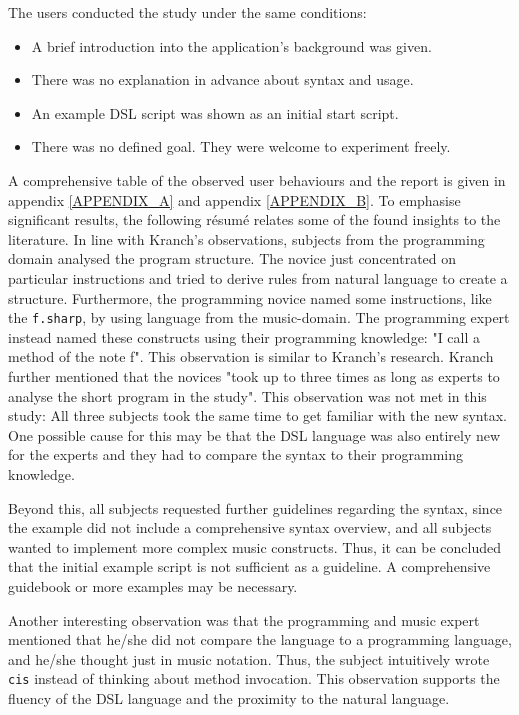 The users conducted the study under the same conditions:

\begin{itemize}
\item A brief introduction into the application's background was given.
\item There was no explanation in advance about syntax and usage.
\item An example DSL script was shown as an initial start script.
\item There was no defined goal. They were welcome to experiment freely.
\end{itemize}

A comprehensive table of the observed user behaviours and the report is given in appendix \ref{APPENDIX_A} and appendix \ref{APPENDIX_B}. To emphasise significant results, the following résumé relates some of the found insights to the literature.
\newline
\newline
In line with Kranch's observations, subjects from the programming domain analysed the program structure. The novice just concentrated on particular instructions and tried to derive rules from natural language to create a structure.\cite{Kranch2012} Furthermore, the programming novice named some instructions, like the \texttt{f.sharp}, by using language from the music-domain. The programming expert instead named these constructs using their programming knowledge: "I call a method of the note f". This observation is similar to Kranch's research. Kranch further mentioned that the novices "took up to three times as long as experts to analyse the short program in the study".\cite[p. 309]{Kranch2012} This observation was not met in this study: All three subjects took the same time to get familiar with the new syntax. One possible cause for this may be that the DSL language was also entirely new for the experts and they had to compare the syntax to their programming knowledge.

Beyond this, all subjects requested further guidelines regarding the syntax, since the example did not include a comprehensive syntax overview, and all subjects wanted to implement more complex music constructs. Thus, it can be concluded that the initial example script is not sufficient as a guideline. A comprehensive guidebook or more examples may be necessary.

Another interesting observation was that the programming and music expert mentioned that he/she did not compare the language to a programming language, and he/she thought just in music notation. Thus, the subject intuitively wrote  \texttt{cis} instead of thinking about method invocation. This observation supports the fluency of the DSL language and the proximity to the natural language.


